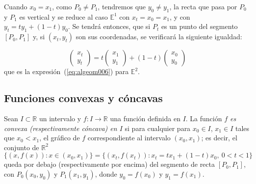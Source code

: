 Cuando $x_{0}=x_{1}$, como $P_{0}\neq P_{1}$, tendremos que $y_{0}\neq y_{1}$, la recta que pasa
por $P_{0}$ y $P_{1}$ es vertical y se reduce al caso $\mathbb{E}^{1}$ con $x_{t}=x_{0}=x_{1}$, y
con $y_{t}=ty_{1}+(1-t)y_{0}$. Se tendrá entonces, que si $P_{t}$ es un punto del segmento
$[P_{0},P_{1}]$ y, si $(x_t,y_t)$ son sus coordenadas, se verificará la siguiente igualdad:

\begin{equation}
\label{eq:algeom011}
 \left(\begin{array}{c}
x_{t} \\
y_{t}
\end{array}\right)=
t\left(\begin{array}{c}
x_{1} \\
y_{1}
\end{array}\right)+
(1-t) \left(\begin{array}{c}
x_{0} \\
y_{0}
\end{array}\right)
\end{equation}
que es la expresión~(\ref{eq:algeom006}) para $\mathbb{E}^{2}$.

\subsection{Funciones convexas y cóncavas}

\begin{defical}
Sean $I\subset \mathbb{R}$ un intervalo y $f\colon I
\rightarrow \mathbb{R}$ una función definida en $I$. La función \emph{$f$ es convexa
(\emph{respectivamente} cóncava) en $I$} si para cualquier para $x_{0} \in I$, $x_{1}\in I$ tales
que $x_{0}<x_{1}$, el gráfico de $f$ correspondiente al intervalo $(x_{0},x_{1})$; es decir, el
conjunto de $\mathbb{R}^2$
\begin{equation}
\label{eq:algeom012}
\{(x,f(x)) : x\in (x_{0},x_{1})\}=\{(x_{t},f(x_{t})) :  x_{t}=tx_{1}+(1-t)x_{0},\ 0<t<1 \}
\end{equation}
queda por debajo (respectivamente por encima) del segmento de recta $[P_{0},P_{1}]$, con
$P_{0}(x_{0},y_{0})$ y  $P_{1}(x_{1},y_{1})$, donde $y_{0}=f(x_{0})$ y $y_{1}=f(x_{1})$.
\end{defical}

